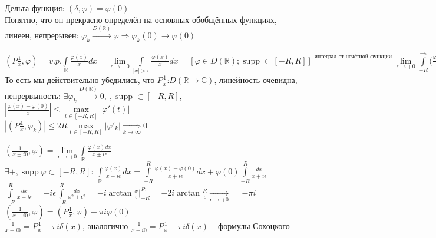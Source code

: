 \begin{enumerate}
\begin{example}
            Дельта-функция: $(\delta, \varphi) = \varphi(0)$\\
            Понятно, что он прекрасно определён на основных обобщённых функциях, линеен, непрерывен: $\varphi_k \overset{D(\mathbb{R})}{\longrightarrow} \varphi \Rightarrow \varphi_k(0) \longrightarrow \varphi(0)$
        \end{example}
        \begin{example}
            $(P\frac{1}{x}, \varphi) = v.p.\int\limits_{\mathbb{R}} \frac{\varphi(x)}{x} dx = \lim\limits_{\epsilon \to +0} \int\limits_{|x| > \epsilon} \frac{\varphi(x)}{x} dx = [\varphi \in D(\mathbb{R}); \operatorname{supp} \subset [-R, R]] \overset{\text{интеграл от нечётной функции}}{=} \lim\limits_{\epsilon \to +0} \int\limits_{-R}^{- \epsilon} (\frac{\varphi(x) - \varphi(0)}{x} dx + \int\limits_{\epsilon}^{R} (\frac{\varphi(x) - \varphi(0)}{x} d x) = \int\limits_{-R}^{R} \frac{\varphi(x) - \varphi(0)}{x} dx$
            То есть мы действительно убедились, что $P \frac{1}{x}$:$D(\mathbb{R} \to \mathbb{C})$, линейность очевидна, непрервыность: $\exists \varphi_k \overset{D(\mathbb{R})} {\longrightarrow} 0, \ , \operatorname{supp} \subset[-R, R]$, $|\frac{\varphi(x) - \varphi(0)}{x}| \leq \max\limits_{t \in[-R; R]} |\varphi'(t)|$\\ $|(P \frac{1}{x}, \varphi_k)| \leq 2R \max\limits_{t \in[-R; R]} |\varphi'_k| \underset{k \to \infty}{\Longrightarrow} 0$
        \end{example}
        \begin{example}
            $(\frac{1}{x \pm i0}, \varphi) = \lim\limits_{\epsilon \to +0} \int\limits_{\mathbb{R}} \frac{\varphi(x) d x}{x \pm i\epsilon}$ \\
            $\exists +, \operatorname{supp} \varphi \subset [-R, R]$: $\int\limits_{\mathbb{R}} \frac{\varphi(x)}{x+i \epsilon} dx =\int\limits_{-R}^{R} \frac{\varphi(x) - \varphi(0)}{x+i \epsilon} dx + \varphi(0) \int\limits_{-R}^{R} \frac{dx}{x+i \epsilon}$ \\ $\int\limits_{-R}^{R} \frac{dx}{x+i \epsilon} = - i\epsilon \int\limits_{-R}^{R} \frac{dx}{x^2+ \epsilon^2} = -i \arctan\frac{x}{\epsilon}|_{-R}^{R} = -2i \arctan\frac{R}{\epsilon} \underset{\epsilon \to +0}{\longrightarrow} = - \pi i$ \\
            $(\frac{1}{x+i0}, \varphi) = (P \frac{1}{x}, \varphi) - \pi i \varphi(0)$
            \\ $\frac{1}{x+i0} = P\frac{1}{x} - \pi i \delta(x)$, аналогично $\frac{1}{x-i0} = P\frac{1}{x} + \pi i \delta(x)$ -- формулы Сохоцкого

\end{example}
\end{enumerate}
